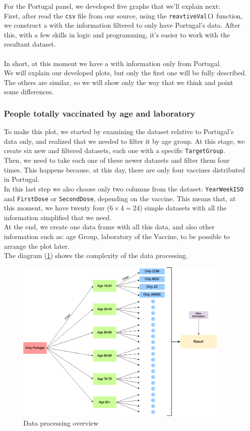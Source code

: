 For the Portugal panel, we developed five graphs that we'll explain next:\\
First, after read the \verb!csv! file from our source, using the \texttt{reavtiveVal()} function, we construct a {} with the information filtered to only have Portugal's data. After this,  with a few skills in logic and programming, it's easier to work with the resultant dataset. \\
\\
In short, at this moment we have a {}  with information only from Portugal.\\
We will explain our developed plots, but only the first one will be fully described. The others are similar, so we will show only the way that we think and point some differences.

\subsubsection{People totally vaccinated by age and laboratory}

To make this plot, we started by examining the dataset relative to Portugal's data only, and realized that we needed to filter it by age group. At this stage, we create six new and filtered datasets, each one with a specific \verb!TargetGroup!. \\ 
Then,  we need to take each one of these newer datasets and filter them four times. This happens because, at this day, there are only four vaccines distributed in Portugal. \\ 
In this last step we also choose only two columns from the dataset: \verb!YearWeekISO! and \verb!FirstDose! or \verb!SecondDose!, depending on the vaccine. This means that, at this moment, we have twenty four ($6 \times 4 = 24$) simple datasets with all the information simplified that we need. \\
At the end, we create one data frame with all this data, and also other information such as: age Group, laboratory of the Vaccine, to be possible to arrange the plot later.
\\
The  diagram (\ref{fig:overview2}) shows the complexity of the data processing.

\begin{figure}[h!]
\centering
\includegraphics[width=300pt,trim=10 0 0 -10mm]{images/coiso2.png}
\caption{Data processing overview}
\label{fig:overview2}
\end{figure}

